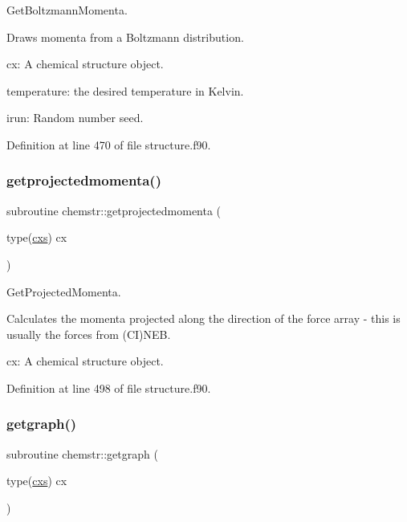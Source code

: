 Get\+Boltzmann\+Momenta. 

Draws momenta from a Boltzmann distribution.


\begin{DoxyItemize}
\item cx\+: A chemical structure object.
\item temperature\+: the desired temperature in Kelvin.
\item irun\+: Random number seed. 
\end{DoxyItemize}

Definition at line 470 of file structure.\+f90.

\mbox{\label{namespacechemstr_a8f2832c53773ad18eadd995ec383cda8}} 
\subsubsection{\texorpdfstring{getprojectedmomenta()}{getprojectedmomenta()}}
{\footnotesize\ttfamily subroutine chemstr\+::getprojectedmomenta (\begin{DoxyParamCaption}\item[{type(\mbox{\hyperlink{structchemstr_1_1cxs}{cxs}})}]{cx }\end{DoxyParamCaption})}



Get\+Projected\+Momenta. 

Calculates the momenta projected along the direction of the force array -\/ this is usually the forces from (CI)N\+EB.


\begin{DoxyItemize}
\item cx\+: A chemical structure object. 
\end{DoxyItemize}

Definition at line 498 of file structure.\+f90.

\mbox{\label{namespacechemstr_abb28977af5498456e127ef24a4398aad}} 
\subsubsection{\texorpdfstring{getgraph()}{getgraph()}}
{\footnotesize\ttfamily subroutine chemstr\+::getgraph (\begin{DoxyParamCaption}\item[{type(\mbox{\hyperlink{structchemstr_1_1cxs}{cxs}})}]{cx }\end{DoxyParamCaption})}



